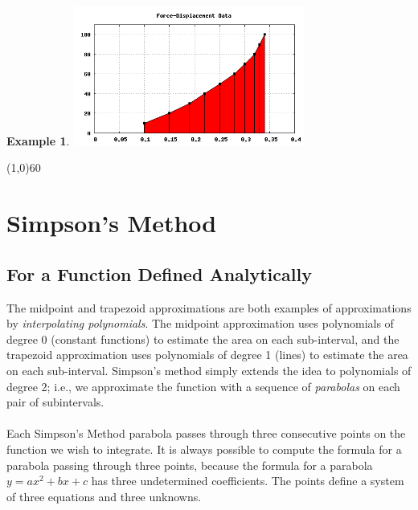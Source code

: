 \documentclass[10.5pt,twoside]{report}
\theoremstyle{definition}
\newtheorem{exmp}{Example}[section]
\begin{document}
\begin{exmp}
\includegraphics[width=3in]{example_2_2_3_1}

\end{exmp}

\line(1,0){60}
\linethickness{0.5mm}
\pagebreak

\pagebreak
\section{Simpson's Method}\label{Simpson's Method}
\subsection{For a Function Defined Analytically}

The midpoint and trapezoid approximations are both examples of approximations by \textit{interpolating polynomials}.  The midpoint approximation uses polynomials of degree 0 (constant functions) to estimate the area on each sub-interval, and the trapezoid approximation uses polynomials of degree 1 (lines) to estimate the area on each sub-interval.  Simpson's method simply extends the idea to polynomials of degree 2; i.e., we approximate the function with a sequence of \textit{parabolas} on each pair of subintervals.\\
${}$\\

Each Simpson's Method parabola passes through three consecutive points on the function we wish to integrate.  It is always possible to compute the formula for a parabola passing through three points, because the formula for a parabola $y=ax^2+bx+c$ has three undetermined coefficients.  The points define a system of three equations and three unknowns.
\end{document}
